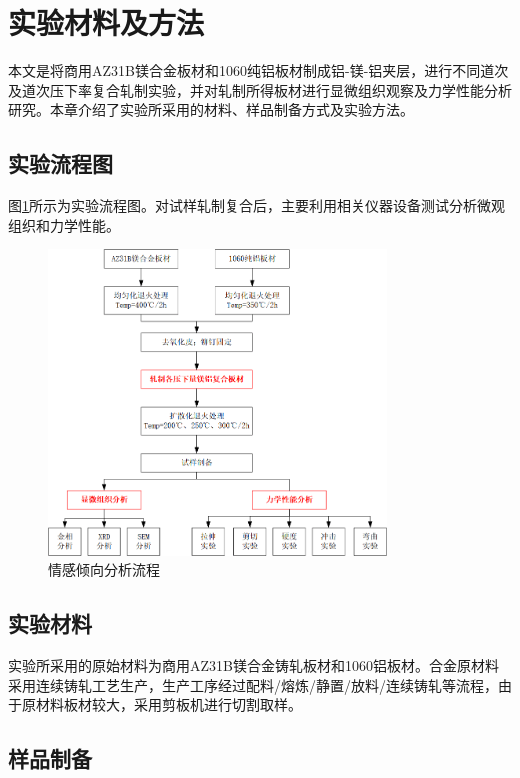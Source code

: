 \section{实验材料及方法}
本文是将商用AZ31B镁合金板材和1060纯铝板材制成铝-镁-铝夹层，进行不同道次及道次压下率复合轧制实验，并对轧制所得板材进行显微组织观察及力学性能分析研究。本章介绍了实验所采用的材料、样品制备方式及实验方法。\par
\subsection{实验流程图}
图\ref{fig:liuchengtu}所示为实验流程图。对试样轧制复合后，主要利用相关仪器设备测试分析微观组织和力学性能。\par

\raggedbottom

\begin{figure}[H]
	\vspace{-0.5em}
	\centering
	\includegraphics[width=0.8\textwidth]{images/liuchengtu.png}
	\caption{情感倾向分析流程}
	\label{fig:liuchengtu}
	\vspace{-1.5em}
\end{figure}
\subsection{实验材料}
实验所采用的原始材料为商用AZ31B镁合金铸轧板材和1060铝板材。合金原材料采用连续铸轧工艺生产，生产工序经过配料/熔炼/静置/放料/连续铸轧等流程，由于原材料板材较大，采用剪板机进行切割取样。\par
\subsection{样品制备}

